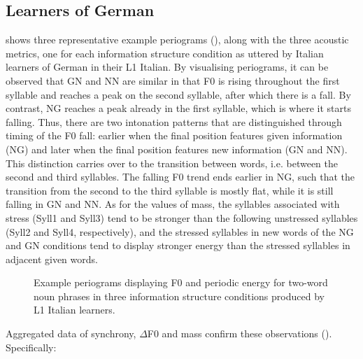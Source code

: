 \subsection{Learners of German}
\label{sec:2.3.1}
 shows three representative example periograms (), along with the three acoustic metrics, one for each information structure condition as uttered by Italian learners of German in their L1 Italian. By visualising periograms, it can be observed that GN and NN are similar in that F0 is rising throughout the first syllable and reaches a peak on the second syllable, after which there is a fall. By contrast, NG reaches a peak already in the first syllable, which is where it starts falling. Thus, there are two intonation patterns that are distinguished through timing of the F0 fall: earlier when the final position features given information (NG) and later when the final position features new information (GN and NN). This distinction carries over to the transition between words, i.e. between the second and third syllables. The falling F0 trend ends earlier in NG, such that the transition from the second to the third syllable is mostly flat, while it is still falling in GN and NN. As for the values of mass, the syllables associated with stress (Syll1 and Syll3) tend to be stronger than the following unstressed syllables (Syll2 and Syll4, respectively), and the stressed syllables in new words of the NG and GN conditions tend to display stronger energy than the stressed syllables in adjacent given words.

\begin{figure}
\caption{Example periograms displaying F0 and periodic energy for two-word noun phrases in three information structure conditions produced by L1 Italian learners.}
\label{fig:2.5}
\end{figure}

Aggregated data of synchrony, ${\Delta}$F0 and mass confirm these observations (). Specifically:


